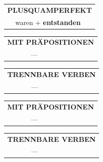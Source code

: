 \documentclass[10pt,a4paper]{revtex4-2}
\begin{document}
\begin{verbbox}
\begin{tabular}{rl}
  \end{tabular}
\hfill
   \begin{tabular}{rl}
      \multicolumn{2}{l}{\textbf{PLUSQUAMPERFEKT}}\\
   & waren + \textbf{entstanden}\\
  \end{tabular}
  
\vspace{10pt}

\begin{tabular}{lll}
\multicolumn{3}{l}{\textbf{MIT PRÄPOSITIONEN}}\\
& --- & \\
\end{tabular}
\hfill
\begin{tabular}{lll}
\multicolumn{3}{l}{\textbf{TRENNBARE VERBEN}}\\
& --- & \\
\end{tabular}

  \vspace{10pt}

\begin{tabular}{lll}
\multicolumn{3}{l}{\textbf{MIT PRÄPOSITIONEN}}\\
& ---\\
\end{tabular}
\hfill
\begin{tabular}{lll}
\multicolumn{3}{l}{\textbf{TRENNBARE VERBEN}}\\
& ---\\
\end{tabular}

  \vspace{-5pt}


\end{verbbox}
\end{document}
